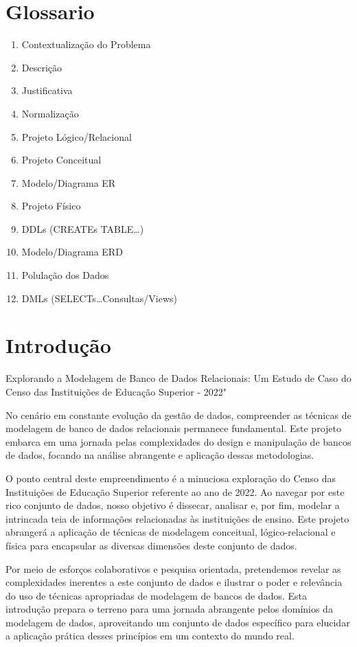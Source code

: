 \documentclass[12pt]{article}
\begin{document}
\section{Glossario}

\begin{enumerate}
 Introdução
    \item Contextualização do Problema
    \item Descrição
    \item Justificativa
    \item Normalização
    \item Projeto Lógico/Relacional
    \item Projeto Conceitual
    \item Modelo/Diagrama ER
    \item Projeto Físico
    \item DDLs (CREATEs TABLE…)
    \item Modelo/Diagrama ERD
    \item Polulação dos Dados
    \item DMLs (SELECTs…Consultas/Views)
\end{enumerate}


\section{Introdução}

Explorando a Modelagem de Banco de Dados Relacionais: Um Estudo de Caso do Censo das Instituições de Educação Superior - 2022"

No cenário em constante evolução da gestão de dados, compreender as técnicas de modelagem de banco de dados relacionais permanece fundamental. Este projeto embarca em uma jornada pelas complexidades do design e manipulação de bancos de dados, focando na análise abrangente e aplicação dessas metodologias.

O ponto central deste empreendimento é a minuciosa exploração do Censo das Instituições de Educação Superior referente ao ano de 2022. Ao navegar por este rico conjunto de dados, nosso objetivo é dissecar, analisar e, por fim, modelar a intrincada teia de informações relacionadas às instituições de ensino. Este projeto abrangerá a aplicação de técnicas de modelagem conceitual, lógico-relacional e física para encapsular as diversas dimensões deste conjunto de dados.

Por meio de esforços colaborativos e pesquisa orientada, pretendemos revelar as complexidades inerentes a este conjunto de dados e ilustrar o poder e relevância do uso de técnicas apropriadas de modelagem de bancos de dados. Esta introdução prepara o terreno para uma jornada abrangente pelos domínios da modelagem de dados, aproveitando um conjunto de dados específico para elucidar a aplicação prática desses princípios em um contexto do mundo real.
\end{document}
